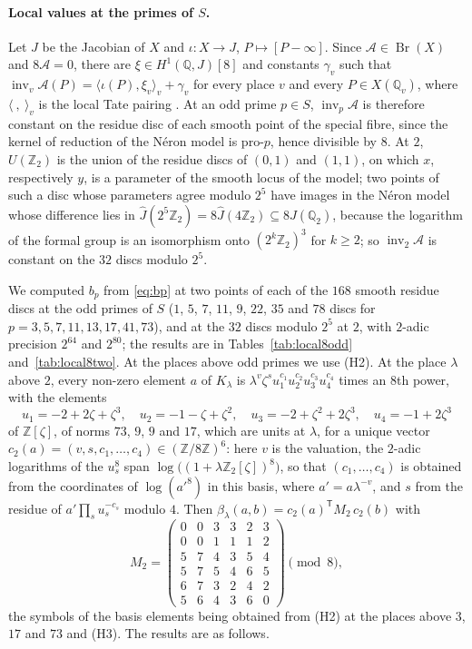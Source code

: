 \documentclass[11pt]{article}
\newcommand{\Z}{\mathbb{Z}}
\newcommand{\Q}{\mathbb{Q}}
\newcommand{\Br}{\operatorname{Br}}
\newcommand{\inv}{\operatorname{inv}}
\begin{document}
\paragraph{Local values at the primes of $S$.} Let $J$ be the Jacobian of $X$ and $\iota\colon X\to J$, $P\mapsto[P-\infty]$. Since $\mathcal A\in\Br(X)$ and $8\mathcal A=0$, there are $\xi\in H^1(\Q,J)[8]$ and constants $\gamma_v$ such that $\inv_v\mathcal A(P)=\langle\iota(P),\xi_v\rangle_v+\gamma_v$ for every place $v$ and every $P\in X(\Q_v)$, where $\langle\ ,\ \rangle_v$ is the local Tate pairing \cite{Sk,St}. At an odd prime $p\in S$, $\inv_p\mathcal A$ is therefore constant on the residue disc of each smooth point of the special fibre, since the kernel of reduction of the N\'eron model is pro-$p$, hence divisible by $8$. At $2$, $U(\Z_2)$ is the union of the residue discs of $(0,1)$ and $(1,1)$, on which $x$, respectively $y$, is a parameter of the smooth locus of the model; two points of such a disc whose parameters agree modulo $2^5$ have images in the N\'eron model whose difference lies in $\hat J(2^5\Z_2)=8\hat J(4\Z_2)\subseteq8J(\Q_2)$, because the logarithm of the formal group is an isomorphism onto $(2^k\Z_2)^3$ for $k\geq2$; so $\inv_2\mathcal A$ is constant on the $32$ discs modulo $2^5$.

We computed $b_p$ from \eqref{eq:bp} at two points of each of the $168$ smooth residue discs at the odd primes of $S$ ($1$, $5$, $7$, $11$, $9$, $22$, $35$ and $78$ discs for $p=3,5,7,11,13,17,41,73$), and at the $32$ discs modulo $2^5$ at $2$, with $2$-adic precision $2^{64}$ and $2^{80}$; the results are in Tables~\ref{tab:local8odd} and~\ref{tab:local8two}. At the places above odd primes we use (H2). At the place $\lambda$ above $2$, every non-zero element $a$ of $K_\lambda$ is $\lambda^{v}\zeta^{s}u_1^{c_1}u_2^{c_2}u_3^{c_3}u_4^{c_4}$ times an $8$th power, with the elements
\[
u_1=-2+2\zeta+\zeta^3,\quad u_2=-1-\zeta+\zeta^2,\quad u_3=-2+\zeta^2+2\zeta^3,\quad u_4=-1+2\zeta^3
\]
of $\Z[\zeta]$, of norms $73$, $9$, $9$ and $17$, which are units at $\lambda$, for a unique vector $c_2(a)=(v,s,c_1,\dots,c_4)\in(\Z/8\Z)^6$: here $v$ is the valuation, the $2$-adic logarithms of the $u_s^8$ span $\log\bigl((1+\lambda\Z_2[\zeta])^8\bigr)$, so that $(c_1,\dots,c_4)$ is obtained from the coordinates of $\log(a'^8)$ in this basis, where $a'=a\lambda^{-v}$, and $s$ from the residue of $a'\prod_su_s^{-c_s}$ modulo $4$. Then $\beta_\lambda(a,b)=c_2(a)^{\mathsf T}M_2\,c_2(b)$ with
\[
M_2=\begin{pmatrix}0&0&3&3&2&3\\0&0&1&1&1&2\\5&7&4&3&5&4\\5&7&5&4&6&5\\6&7&3&2&4&2\\5&6&4&3&6&0\end{pmatrix}\pmod 8,
\]
the symbols of the basis elements being obtained from (H2) at the places above $3$, $17$ and $73$ and (H3). The results are as follows.
\end{document}
